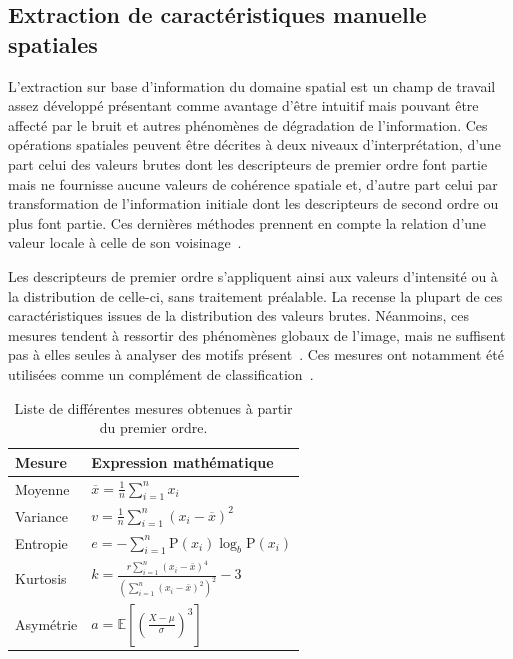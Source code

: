 \subsection{Extraction de caractéristiques manuelle spatiales}
L'extraction sur base d'information du domaine spatial est un champ de travail assez développé présentant comme avantage d'être intuitif mais pouvant être affecté par le bruit et autres phénomènes de dégradation de l'information. Ces opérations spatiales peuvent être décrites à deux niveaux d'interprétation, d'une part celui des valeurs brutes dont les descripteurs de premier ordre font partie mais ne fournisse aucune valeurs de cohérence spatiale et, d'autre part celui par transformation de l'information initiale dont les descripteurs de second ordre ou plus font partie. Ces dernières méthodes prennent en compte la relation d'une valeur locale à celle de son voisinage~\cite{Kamila2015}.\par

Les descripteurs de premier ordre s'appliquent ainsi aux valeurs d'intensité ou à la distribution de celle-ci, sans traitement préalable. La  recense la plupart de ces caractéristiques issues de la distribution des valeurs brutes. Néanmoins, ces mesures tendent à ressortir des phénomènes globaux de l'image, mais ne suffisent pas à elles seules à analyser des motifs présent~\cite{Tomita1990, Srinivasan2008, Uyun2013, NyeinNyeinHlaing2015}. Ces mesures ont notamment été utilisées comme un complément de classification~\cite{Wiltgen2008}.\par

\begin{table}[H]
    \centering
    \begin{tabular}{ll}
        \toprule
        \textbf{Mesure}             & \textbf{Expression mathématique}                                                  \\ \hline
        Moyenne                     & $\overline{x} = \frac{1}{n}\sum_{i=1}^n x_i$                                      \\   
        Variance                    & $v = \frac{1}{n}\sum_{i=1}^n \left(x_i - \overline{x}\right)^2$                   \\ 
        Entropie                    & $e = -\sum_{i=1}^n {\mathrm{P}(x_i) \log_b \mathrm{P}(x_i)}$                      \\
        Kurtosis                    & $k=\frac{r \sum_{i=1}^{n}\left(x_{i}-\bar{x}\right)^{4}}{\left(\sum_{i=1}^{n}\left(x_{i}-\bar{x}\right)^{2}\right)^{2}}-3$\\
        Asymétrie                   & $a = \mathbb{E} \left[ \left( \frac{X - \mu}{\sigma} \right)^3 \right]$           \\  
        \bottomrule
    \end{tabular}
    \caption{Liste de différentes mesures obtenues à partir du premier ordre.}
    \label{tab:first_order_descriptors}
\end{table}\par

